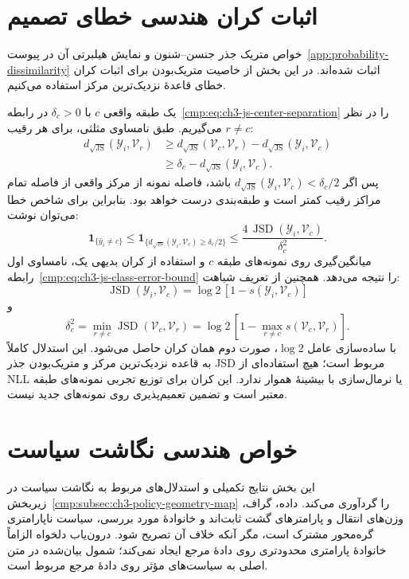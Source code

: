 \section{اثبات کران هندسی خطای تصمیم}
\label{app:ch3-js-error-proof}
خواص متریک جذر جنسن--شنون و نمایش هیلبرتی آن در پیوست~\ref{app:probability-dissimilarity} اثبات شده‌اند. در این بخش از خاصیت متریک‌بودن برای اثبات کران خطای قاعدهٔ نزدیک‌ترین مرکز استفاده می‌کنیم.

یک طبقه واقعی $c$ با $\delta_c>0$ در رابطه~\eqref{cmp:eq:ch3-js-center-separation} را در نظر می‌گیریم. طبق نامساوی مثلثی، برای هر رقیب $r\ne c$:
\[
\begin{aligned}
d_{\sqrt{\mathrm{JS}}}(\mathscr Y_i,\mathcal V_r)
&\ge d_{\sqrt{\mathrm{JS}}}(\mathcal V_c,\mathcal V_r)
-d_{\sqrt{\mathrm{JS}}}(\mathscr Y_i,\mathcal V_c)\\
&\ge\delta_c-d_{\sqrt{\mathrm{JS}}}(\mathscr Y_i,\mathcal V_c).
\end{aligned}
\]
پس اگر $d_{\sqrt{\mathrm{JS}}}(\mathscr Y_i,\mathcal V_c)<\delta_c/2$ باشد، فاصله نمونه از مرکز واقعی از فاصله تمام مراکز رقیب کمتر است و طبقه‌بندی درست خواهد بود. بنابراین برای شاخص خطا می‌توان نوشت:
\begin{equation}\label{eq:app-ch3-js-error-indicator}
\mathbf1_{\{\widehat y_i\ne c\}}
\le\mathbf1_{\{d_{\sqrt{\mathrm{JS}}}(\mathscr Y_i,\mathcal V_c)\ge\delta_c/2\}}
\le\frac{4\,\operatorname{JSD}(\mathscr Y_i,\mathcal V_c)}
{\delta_c^2}.
\end{equation}
میانگین‌گیری روی نمونه‌های طبقه $c$ و استفاده از کران بدیهی یک، نامساوی اول رابطه~\eqref{cmp:eq:ch3-js-class-error-bound} را نتیجه می‌دهد. همچنین از تعریف شباهت:
\[
\operatorname{JSD}(\mathscr Y_i,\mathcal V_c)
=\log2\,[1-s(\mathscr Y_i,\mathcal V_c)]
\]
و
\[
\delta_c^2
=\min_{r\ne c}\operatorname{JSD}(\mathcal V_c,\mathcal V_r)
=\log2\,[1-\max_{r\ne c}s(\mathcal V_c,\mathcal V_r)].
\]
با ساده‌سازی عامل $\log2$، صورت دوم همان کران حاصل می‌شود. این استدلال کاملاً به قاعده نزدیک‌ترین مرکز و متریک‌بودن جذر JSD مربوط است؛ هیچ استفاده‌ای از NLL یا نرمال‌سازی با بیشینهٔ هموار ندارد. این کران برای توزیع تجربی نمونه‌های طبقه معتبر است و تضمین تعمیم‌پذیری روی نمونه‌های جدید نیست.

\section{خواص هندسی نگاشت سیاست}
\label{app:geometry-policy-base}

این بخش نتایج تکمیلی و استدلال‌های مربوط به نگاشت سیاست در زیربخش~\ref{cmp:subsec:ch3-policy-geometry-map} را گردآوری می‌کند. داده، گراف، وزن‌های انتقال و پارامترهای گشت ثابت‌اند و خانوادهٔ مورد بررسی، سیاست ناپارامتری گره‌محور مشترک است، مگر آنکه خلاف آن تصریح شود. درون‌یاب دلخواه الزاماً خانوادهٔ پارامتری محدودتری روی دادهٔ مرجع ایجاد نمی‌کند؛ شمول بیان‌شده در متن اصلی به سیاست‌های مؤثر روی دادهٔ مرجع مربوط است.

